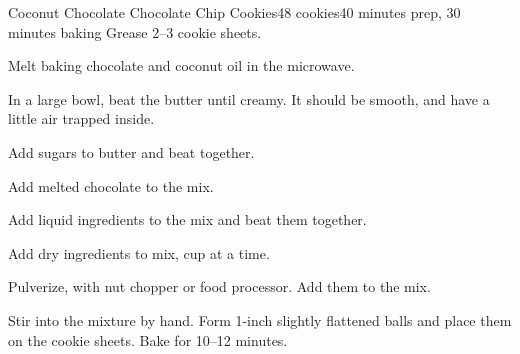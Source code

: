 \documentclass[../Cookbook.tex]{subfiles}
\begin{document}
\begin{recipe}{Coconut Chocolate Chocolate Chip Cookies}{48 cookies}{40 minutes prep, 30 minutes baking}
	 Grease 2--3 cookie sheets.

	Melt baking chocolate and coconut oil in the microwave.


	In a large bowl, beat the butter until creamy. It should be smooth, and have a little air trapped inside.

	Add sugars to butter and beat together.

	\newstep
	Add melted chocolate to the mix.

	Add liquid ingredients to the mix and beat them together.

	Add dry ingredients to mix,  cup at a time.

	Pulverize, with nut chopper or food processor. Add them to the mix.

	Stir into the mixture by hand. Form 1-inch slightly flattened balls and place them on the cookie sheets. Bake for 10--12 minutes.

\end{recipe}
\end{document}
